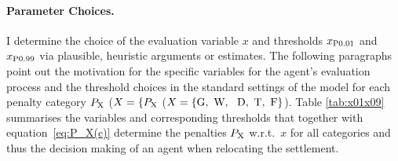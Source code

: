 
\paragraph{Parameter Choices.} %
I determine the choice of the evaluation variable $x$ and thresholds $x_{\rm P0.01}$ and $x_{\rm P0.99}$ via plausible, heuristic arguments or estimates.
The following paragraphs point out the motivation for the specific variables for the agent's evaluation process and the threshold choices in the standard settings of the model for each penalty category $P_{\rm X}$ ($X=\{P_{\rm X}$ ($X=\{\text{G,\, W, \, D,\, T,\, F}\}$).
Table \ref{tab:x01x09} summarises the variables and corresponding thresholds that together with equation~\ref{eq:P_X(c)} determine the penalties $P_{\rm X}$ w.r.t.\ $x$ for all categories and thus the decision making of an agent when relocating the settlement.


